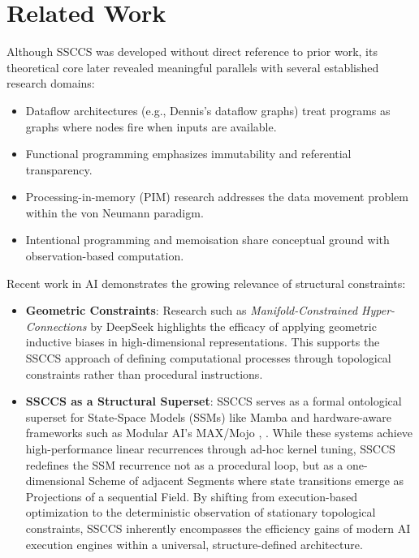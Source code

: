 \documentclass[
  a4paper,
  DIV=11,
  numbers=noendperiod]{scrartcl}
\providecommand{\tightlist}{%
  \setlength{\itemsep}{0pt}\setlength{\parskip}{0pt}}
\begin{document}
\section{Related Work}\label{related-work}

Although SSCCS was developed without direct reference to prior work, its
theoretical core later revealed meaningful parallels with several
established research domains:

\begin{itemize}
\tightlist
\item
  Dataflow architectures (e.g., Dennis's dataflow graphs) treat programs
  as graphs where nodes fire when inputs are available.
\item
  Functional programming emphasizes immutability and referential
  transparency.
\item
  Processing-in-memory (PIM) research addresses the data movement
  problem within the von Neumann paradigm.
\item
  Intentional programming and memoisation share conceptual ground with
  observation-based computation.
\end{itemize}

Recent work in AI demonstrates the growing relevance of structural
constraints:

\begin{itemize}
\item
  \textbf{Geometric Constraints}: Research such as
  \emph{Manifold-Constrained Hyper-Connections} by DeepSeek
   highlights the efficacy
  of applying geometric inductive biases in high-dimensional
  representations. This supports the SSCCS approach of defining
  computational processes through topological constraints rather than
  procedural instructions.
\item
  \textbf{SSCCS as a Structural Superset}: SSCCS serves as a formal
  ontological superset for State-Space Models (SSMs) like Mamba
   and hardware-aware frameworks such
  as Modular AI's MAX/Mojo ,
  . While these systems achieve
  high-performance linear recurrences through ad-hoc kernel tuning,
  SSCCS redefines the SSM recurrence not as a procedural loop, but as a
  one-dimensional Scheme of adjacent Segments where state transitions
  emerge as Projections of a sequential Field. By shifting from
  execution-based optimization to the deterministic observation of
  stationary topological constraints, SSCCS inherently encompasses the
  efficiency gains of modern AI execution engines within a universal,
  structure-defined architecture.
\end{itemize}
\end{document}
